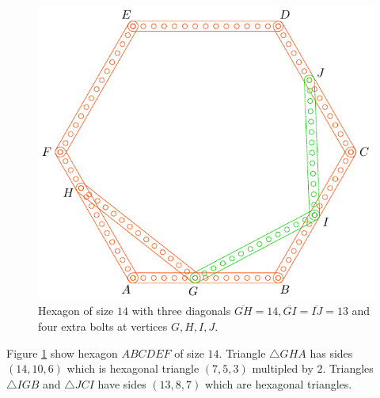 \documentclass[11pt]{article}
\begin{document}
\begin{figure}[H]
\centering
\includegraphics[scale=1]{14/hexa-14a}
\caption{Hexagon of size $14$ with three diagonals $\overline{GH} = 14, \overline{GI} = \overline{IJ} = 13$ and four extra bolts at vertices $G,H,I,J$.}
\label{fig:14a}
\end{figure}

Figure \ref{fig:14a} show hexagon $ABCDEF$ of size $14$. Triangle $\triangle{GHA}$ has sides $(14,10,6)$ which is hexagonal triangle $(7,5,3)$ multipled by $2$. Triangles $\triangle{IGB}$ and $\triangle{JCI}$ have sides $(13,8,7)$ which are hexagonal triangles.
\end{document}
